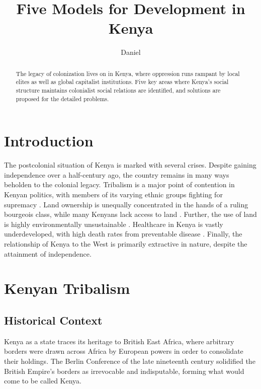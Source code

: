 \documentclass{../../../coursework}
\title{Five Models for Development in Kenya}
\subtitle{}
\author{Daniel}{Glenn}{Leonard}
\date{\displaydate{date}}
\begin{document}
\maketitle

\begin{abstract}
    The legacy of colonization lives on in Kenya, where oppression runs
    rampant by local elites as well as global capitalist institutions. Five
    key areas where Kenya's social structure maintains colonialist social
    relations are identified, and solutions are proposed for the detailed
    problems.
\end{abstract}

\printkeywords

\section{Introduction}

The postcolonial situation of Kenya is marked with several crises. Despite
gaining independence over a half-century ago, the country remains in many ways
beholden to the colonial legacy. Tribalism is a major point of contention in
Kenyan politics, with members of its varying ethnic groups fighting for
supremacy \parencite{Orvis2001}. Land ownership is unequally concentrated in
the hands of a ruling bourgeois class, while many Kenyans lack access to land
\parencite{Syagga2006}. Further, the use of land is highly environmentally
unsustainable \parencite{Syagga2006}. Healthcare in Kenya is vastly
underdeveloped, with high death rates from preventable disease
\parencite{Feikin2011}. Finally, the relationship of Kenya to the West is
primarily extractive in nature, despite the attainment of independence.

\section{Kenyan Tribalism}
\subsection{Historical Context}

Kenya as a state traces its heritage to British East Africa, where arbitrary
borders were drawn across Africa by European powers in order to consolidate
their holdings. The Berlin Conference of the late nineteenth century
solidified the British Empire's borders as irrevocable and indisputable,
forming what would come to be called Kenya.
\end{document}
